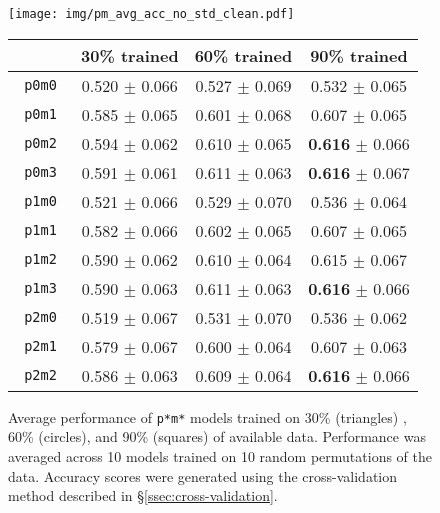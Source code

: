 \begin{figure*}
  \begin{minipage}[b]{0.45\textwidth}
    \begin{centering}
      \texttt{[image: img/pm\_avg\_acc\_no\_std\_clean.pdf]}
    \end{centering}
    \caption{ Average performance of \texttt{p*m*} models trained on 30\%
    (triangles) , 60\% (circles), and 90\% (squares) of available data.
    Performance was averaged across 10 models trained on 10 random permutations
    of the data. Accuracy scores were generated using the cross-validation
    method described in \S \ref{ssec:cross-validation}.}
    \label{subfig:pm-model-chart}
  \end{minipage}
  \hspace{0.5cm}
  \begin{minipage}[b]{0.45\textwidth}
    \begin{centering}
    \begin{tabular}{ l | c c c }
    & \textbf{30\% trained} & \textbf{60\% trained} & \textbf{90\% trained} \\
    \hline
    \texttt{ p0m0 } &   0.520 $\pm$ 0.066 & 0.527 $\pm$ 0.069 & 0.532 $\pm$ 0.065 \\
    \texttt{ p0m1 } &   0.585 $\pm$ 0.065 & 0.601 $\pm$ 0.068 & 0.607 $\pm$ 0.065 \\
    \texttt{ p0m2 } &   0.594 $\pm$ 0.062 & 0.610 $\pm$ 0.065 & \textbf{0.616} $\pm$ 0.066 \\
    \texttt{ p0m3 } &   0.591 $\pm$ 0.061 & 0.611 $\pm$ 0.063 & \textbf{0.616} $\pm$ 0.067 \\
    \hline
    \texttt{ p1m0 } &   0.521 $\pm$ 0.066 & 0.529 $\pm$ 0.070 & 0.536 $\pm$ 0.064 \\
    \texttt{ p1m1 } &   0.582 $\pm$ 0.066 & 0.602 $\pm$ 0.065 & 0.607 $\pm$ 0.065 \\
    \texttt{ p1m2 } &   0.590 $\pm$ 0.062 & 0.610 $\pm$ 0.064 & 0.615 $\pm$ 0.067 \\
    \texttt{ p1m3 } &   0.590 $\pm$ 0.063 & 0.611 $\pm$ 0.063 & \textbf{0.616} $\pm$ 0.066 \\
    \hline
    \texttt{ p2m0 } &   0.519 $\pm$ 0.067 & 0.531 $\pm$ 0.070 & 0.536 $\pm$ 0.062 \\
    \texttt{ p2m1 } &   0.579 $\pm$ 0.067 & 0.600 $\pm$ 0.064 & 0.607 $\pm$ 0.063 \\
    \texttt{ p2m2 } &   0.586 $\pm$ 0.063 & 0.609 $\pm$ 0.064 & \textbf{0.616} $\pm$ 0.066 \\

\end{tabular}
\end{centering}
\end{minipage}
\end{figure*}
